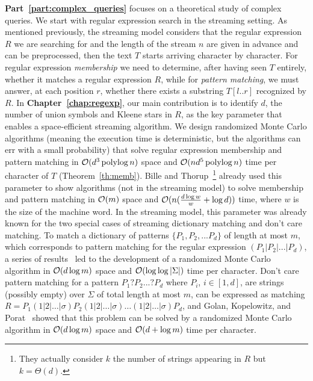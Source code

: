 \textbf{Part~\ref{part:complex_queries}} focuses on a theoretical study of complex queries. 
%
We start with regular expression search in the streaming setting.
%
As mentioned previously, the streaming model considers that the regular expression $R$ we are searching for and the length of the stream $n$ are given in advance and can be preprocessed, then the text $T$ starts arriving character by character. For regular expression \emph{membership} we need to determine, after having seen $T$ entirely, whether it matches a regular expression $R$, while for \emph{pattern matching}, we must answer, at each position $r$, whether there exists a substring $T[l..r]$ recognized by $R$.
In \textbf{Chapter~\ref{chap:regexp}}, our main contribution is to identify $d$, the number of union symbols and Kleene stars in $R$, as the key parameter that enables a space-efficient streaming algorithm. We design randomized Monte Carlo algorithms (meaning the execution time is deterministic, but the algorithms can err with a small probability) that solve regular expression membership and pattern matching in $\mathcal{O}(d^3\operatorname{polylog} n)$ space and $\mathcal{O}(nd^5\operatorname{polylog} n)$ time per character of $T$ (Theorem~\ref{th:memb}).
Bille and Thorup~\cite{doi:10.1137/1.9781611973075.104}\footnote{They actually consider $k$ the number of strings appearing in $R$ but $k=\Theta(d)$.} already used this parameter to  show algorithms (not in the streaming model) to solve membership and pattern matching in $\mathcal{O}(m)$ space and $\mathcal{O}(n(\frac{d\log w}{w} + \log d))$ time, where $w$ is the size of the machine word.
In the streaming model, this parameter was already known for the two special cases of streaming dictionary matching and don't care matching. To match a dictionary of patterns $\{P_1, P_2, ... P_d \}$ of length at most $m$, which corresponds to pattern matching for the regular expression $(P_1| P_2| ... | P_d)$, a series of results~\cite{Porat:09,DBLP:journals/talg/BreslauerG14,DBLP:conf/esa/CliffordFPSS15,DBLP:conf/esa/GolanP17,DBLP:conf/icalp/GolanKP18} led to the development of a randomized Monte Carlo algorithm in $\mathcal{O}(d\log m)$ space and $\mathcal{O}(\log \log |\Sigma|)$ time per character.
Don't care pattern matching for a pattern $P_1 ? P_2 ... ? P_d$ where $P_i$, $i \in [1,d]$, are strings (possibly empty) over $\Sigma$ of total length at most $m$, can be expressed as matching $R = P_1 (1|2|\ldots|\sigma) P_2 (1|2|\ldots|\sigma) \ldots (1|2|\ldots|\sigma) P_{d}$, and Golan, Kopelowitz, and Porat~\cite{DBLP:journals/algorithmica/GolanKP19} showed that this problem can be solved by a randomized Monte Carlo algorithm in $\mathcal{O}(d \log m)$ space and $\mathcal{O}(d+\log m)$ time per character.

